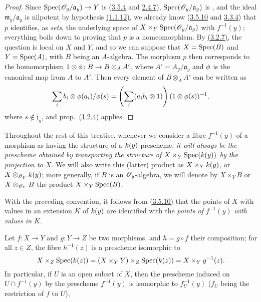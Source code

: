 \begin{proof}
\label{proof-prop-1.3.6.1}
Since ${\mathop{\mathrm{Spec}}\nolimits}(\mathscr{O}_y/\mathfrak{a}_y)\to Y$ is  (\hyperref[defn-1.3.5.4]{3.5.4} and \hyperref[cor-1.2.4.7]{2.4.7}), ${\mathop{\mathrm{Spec}}\nolimits}(\mathscr{O}_y/\mathfrak{a}_y)$ is , and the ideal $\mathfrak{m}_y/\mathfrak{a}_y$ is nilpotent by hypothesis \hyperref[cor-1.1.1.12]{(1.1.12)}, we already know (\hyperref[cor-1.3.5.10]{3.5.10} and \hyperref[cor-1.3.3.4]{3.3.4}) that $p$ identifies, as \emph{sets}, the underlying space of $X\times_Y{\mathop{\mathrm{Spec}}\nolimits}(\mathscr{O}_y/\mathfrak{a}_y)$ with $f^{-1}(y)$; everything boils down to proving that $p$ is a homeomorphism.
By \hyperref[cor-1.3.2.7]{(3.2.7)}, the question is local on $X$ and $Y$, and so we can suppose that $X={\mathop{\mathrm{Spec}}\nolimits}(B)$ and $Y={\mathop{\mathrm{Spec}}\nolimits}(A)$, with $B$ being an $A$-algebra.
The morphism $p$ then corresponds to the homomorphism $1\otimes\phi\colon B\to B\otimes_A A'$, where $A'=A_y/\mathfrak{a}_y$ and $\phi$ is the canonical map from $A$ to $A'$.
Then every element of $B\otimes_A A'$ can be written as
\begin{equation*}
    \sum_i b_i\otimes\phi(a_i)/\phi(s) = \left(\sum_i(a_ib_i\otimes1)\right)(1\otimes\phi(s))^{-1},
\end{equation*}
where $s\not\in\mathfrak{j}_y$, and prop.~\hyperref[cor-1.1.2.4]{(1.2.4)} applies.
\end{proof}

\begin{env}[3.6.2]
\label{env-1.3.6.2}
Throughout the rest of this treatise, whenever we consider a fibre $f^{-1}(y)$ of a morphism as having the structure of a $k(y)$-prescheme, \emph{it will always be the prescheme obtained by transporting the structure of $X\times_Y{\mathop{\mathrm{Spec}}\nolimits}(k(y))$ by the projection to $X$}.
We will also write this (latter) product as $X\times_Yk(y)$, or $X\otimes_{\mathscr{O}_Y}k(y)$; more generally, if $B$ is an $\mathscr{O}_y$-algebra, we will denote by $X\times_Y B$ or $X\otimes_{\mathscr{O}_Y}B$ the product $X\times_Y{\mathop{\mathrm{Spec}}\nolimits}(B)$.
\end{env}

With the preceding convention, it follows from \hyperref[cor-1.3.5.10]{(3.5.10)} that the points of $X$ with values in an extension $K$ of $k(y)$ are identified with the \emph{points of $f^{-1}(y)$ with values in $K$}.

\begin{env}[3.6.3]
\label{env-1.3.6.3}
Let $f\colon X\to Y$ and $g\colon Y\to Z$ be two morphisms, and $h=g\circ f$ their composition; for all $z\in Z$, the fibre $h^{-1}(z)$ is a prescheme isomorphic to
\begin{equation*}
    X\times_Z{\mathop{\mathrm{Spec}}\nolimits}(k(z)) = (X\times_Y Y)\times_Z{\mathop{\mathrm{Spec}}\nolimits}(k(z)) = X\times_Y g^{-1}(z).
\end{equation*}
In particular, if $U$ is an open subset of $X$, then the prescheme induced on $U\cap f^{-1}(y)$ by the prescheme $f^{-1}(y)$ is isomorphic to $f^{-1}_U(y)$ ($f_U$ being the restriction of $f$ to $U$),
\end{env}

